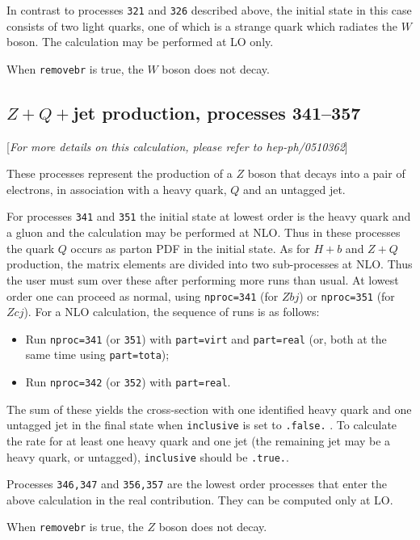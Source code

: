\documentclass{article}
\begin{document}
{{{{{{In contrast to processes {\tt 321} and {\tt 326} described above, the initial
state in this case consists of two light quarks, one of which is a
strange quark which radiates the $W$ boson. The calculation may
be performed at LO only.

When {\tt removebr} is true, the $W$ boson does not decay.

\subsection{$Z+Q+$jet production, processes 341--357}
\label{subsec:ZQj}

\begin{center}
[{\it For more details on this calculation, please refer to hep-ph/0510362}]
\end{center}

These processes represent the production of a $Z$
boson that decays into a pair of electrons,
in association with a heavy quark, $Q$ and an untagged jet.

For processes {\tt 341} and {\tt 351} the initial state at lowest
order is the heavy quark and a gluon and the calculation may be
performed at NLO.  Thus in these processes the quark $Q$ occurs as
parton PDF in the initial state.  As for $H+b$ and $Z+Q$ production,
the matrix elements are divided into two sub-processes at NLO. Thus
the user must sum over these after performing more runs than usual. At
lowest order one can proceed as normal, using {\tt nproc=341} (for
$Zbj$) or {\tt nproc=351} (for $Zcj$).  For a NLO calculation, the
sequence of runs is as follows:
\begin{itemize}
\item Run {\tt nproc=341} (or {\tt 351}) with {\tt part=virt} and
{\tt part=real} (or, both at the same time using {\tt part=tota});
\item Run {\tt nproc=342} (or {\tt 352}) with {\tt part=real}.
\end{itemize}
The sum of these yields the cross-section with one identified heavy
quark and one untagged jet in the final state when {\tt inclusive} is
set to {\tt .false.} . To calculate the rate for at least one heavy
quark and one jet (the remaining jet may be a heavy quark, or
untagged), {\tt inclusive} should be {\tt .true.}.

Processes {\tt 346,347} and {\tt 356,357} are the lowest order processes that enter
the above calculation in the real contribution. They can be computed only at LO.

When {\tt removebr} is true, the $Z$ boson does not decay.

}}}}}}
\end{document}
